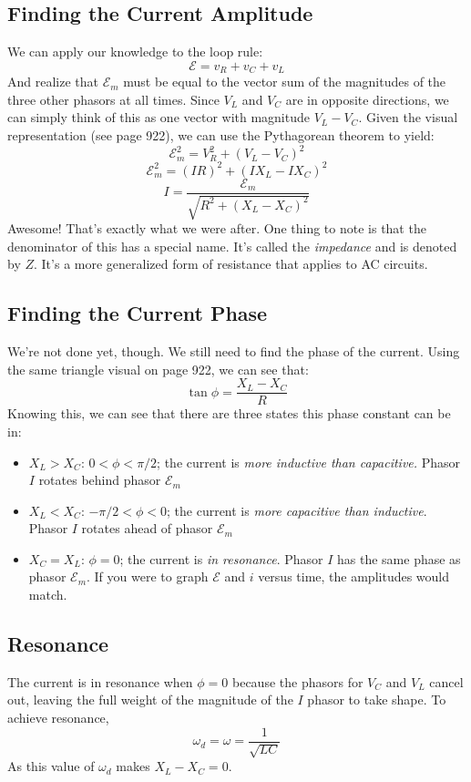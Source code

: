 \documentclass[]{article}
\begin{document}
\subsection{Finding the Current Amplitude}
We can apply our knowledge to the loop rule:
\[ \mathcal{E} = v_R + v_C + v_L \]
And realize that $ \mathcal{E}_m $ must be equal to the vector sum of the magnitudes of the three other phasors at all times. Since $ V_L $ and $ V_C $ are in opposite directions, we can simply think of this as one vector with magnitude $ V_L - V_C $. Given the visual representation (see page 922), we can use the Pythagorean theorem to yield:
\[ \mathcal{E}_m^2 = V_R^2 + \left(V_L - V_C\right)^2 \]
\[ \mathcal{E}_m^2 = \left(IR\right)^2 + \left(IX_L - IX_C\right)^2 \]
\[ I = \frac{\mathcal{E}_m}{\sqrt{R^2 + \left(X_L - X_C\right)^2}} \]
Awesome! That's exactly what we were after. One thing to note is that the denominator of this has a special name. It's called the \emph{impedance} and is denoted by $ Z $. It's a more generalized form of resistance that applies to AC circuits.

\subsection{Finding the Current Phase}
We're not done yet, though. We still need to find the phase of the current. Using the same triangle visual on page 922, we can see that:
\[ \tan \phi = \frac{X_L - X_C}{R} \]
Knowing this, we can see that there are three states this phase constant can be in:
\begin{itemize}
  \item $ X_L > X_C $: $ 0 < \phi < \pi/2 $; the current is \emph{more inductive than capacitive.} Phasor $ I $ rotates behind phasor $ \mathcal{E}_m $
  \item $ X_L < X_C $: $ -\pi/2 < \phi < 0 $; the current is \emph{more capacitive than inductive}. Phasor $ I $ rotates ahead of phasor $ \mathcal{E}_m $
  \item $ X_C = X_L $: $ \phi = 0 $; the current is \emph{in resonance}. Phasor $ I $ has the same phase as phasor $ \mathcal{E}_m $. If you were to graph $ \mathcal{E} $ and $ i $ versus time, the amplitudes would match.
\end{itemize}

\subsection{Resonance}
The current is in resonance when $ \phi = 0 $ because the phasors for $ V_C $ and $ V_L $ cancel out, leaving the full weight of the magnitude of the $ I $ phasor to take shape. To achieve resonance,
\[ \omega_d = \omega = \frac{1}{\sqrt{LC}} \]
As this value of $ \omega_d $ makes $ X_L - X_C = 0 $.
\end{document}
